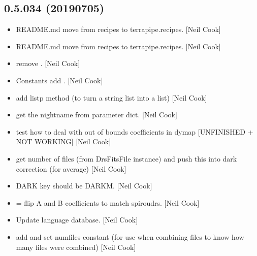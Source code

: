 \documentclass[a4paper,10pt,english]{report}
\begin{document}
\subsection{0.5.034 (2019\sphinxhyphen{}07\sphinxhyphen{}05)}
\label{\detokenize{misc/changelog:id125}}\begin{itemize}
\item {} 
README.md \sphinxhyphen{} move from recipes to terrapipe.recipes. {[}Neil Cook{]}

\item {} 
README.md \sphinxhyphen{} move from recipes to terrapipe.recipes. {[}Neil Cook{]}

\item {} 
 \sphinxhyphen{} remove . {[}Neil Cook{]}

\item {} 
Constants \sphinxhyphen{} add . {[}Neil Cook{]}

\item {} 
 \sphinxhyphen{} add listp method (to turn a string list into a
list) {[}Neil Cook{]}

\item {} 
 \sphinxhyphen{} get the nightname from parameter dict. {[}Neil
Cook{]}

\item {} 
 \sphinxhyphen{} test how to deal with out of bounds
coefficients in dymap {[}UNFINISHED + NOT WORKING{]} {[}Neil Cook{]}

\item {} 
 \sphinxhyphen{} get number of files (from DrsFitsFile
instance) and push this into dark correction (for average) {[}Neil Cook{]}

\item {} 
 \sphinxhyphen{} DARK key should be DARKM. {[}Neil Cook{]}

\item {} 
 = flip A and B coefficients to
match spiroudrs. {[}Neil Cook{]}

\item {} 
Update language database. {[}Neil Cook{]}

\item {} 
 \sphinxhyphen{} add and set numfiles constant (for use when combining
files to know how many files were combined) {[}Neil Cook{]}


\end{itemize}
\end{document}
